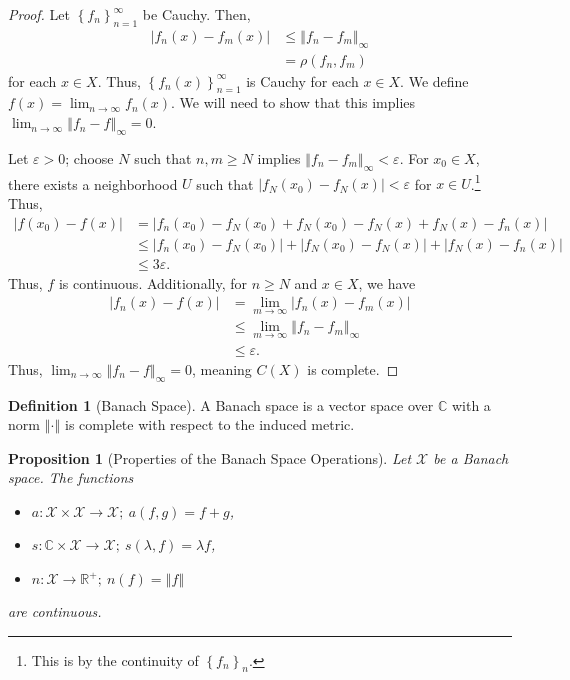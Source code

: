 \documentclass[12pt]{extarticle}
\newcommand{\R}{\mathbb{R}}
\newcommand{\C}{\mathbb{C}}
\newcommand{\norm}[1]{\left\Vert #1\right\Vert}
\newcommand{\set}[1]{\left\{#1\right\}}
\theoremstyle{plain}
\newtheorem*{proposition}{Proposition}
\theoremstyle{definition}
\newtheorem*{definition}{Definition}
\theoremstyle{note}
\renewcommand{\newline}{\hfill\break}
\begin{document}
\begin{proof}
  Let $\set{f_n}_{n=1}^{\infty}$ be Cauchy. Then,
  \begin{align*}
    \left\vert f_n(x) - f_m(x) \right\vert &\leq \norm{f_n - f_m}_{\infty}\\
    &= \rho(f_n,f_m)
  \end{align*}
  for each $x\in X$. Thus, $\set{f_n(x)}_{n=1}^{\infty}$ is Cauchy for each $x\in X$. We define $f(x) = \lim_{n\rightarrow \infty}f_n(x)$. We will need to show that this implies $\lim_{n\rightarrow\infty}\norm{f_n-f}_{\infty} = 0$.\newline

  Let $\varepsilon > 0$; choose $N$ such that $n,m \geq N$ implies $\norm{f_n - f_m}_{\infty} < \varepsilon$. For $x_0\in X$, there exists a neighborhood $U$ such that $\left\vert f_N(x_0) - f_N(x) \right\vert < \varepsilon$ for $x\in U$.\footnote{This is by the continuity of $\set{f_n}_n$.} Thus,
  \begin{align*}
    \left\vert f(x_0) - f(x) \right\vert &= \left\vert f_n(x_0) - f_N(x_0) + f_N(x_0) - f_N(x) + f_N(x) - f_n(x) \right\vert\\
                                         &\leq \left\vert f_n(x_0) - f_N(x_0) \right\vert + \left\vert f_N(x_0) - f_N(x) \right\vert + \left\vert f_N(x) - f_n(x) \right\vert\\
                                         &\leq 3\varepsilon.
  \end{align*}
  Thus, $f$ is continuous. Additionally, for $n\geq N$ and $x\in X$, we have
  \begin{align*}
    \left\vert f_n(x) - f(x) \right\vert &= \lim_{m\rightarrow\infty}\left\vert f_n(x) - f_m(x) \right\vert\\
                                         &\leq \lim_{m\rightarrow\infty}\norm{f_n-f_m}_{\infty}\\
                                         &\leq \varepsilon.
  \end{align*}
  Thus, $\lim_{n\rightarrow\infty}\norm{f_n - f}_{\infty} = 0$, meaning $C(X)$ is complete.
\end{proof}
\begin{definition}[Banach Space]
  A Banach space is a vector space over $\C$ with a norm $\norm{\cdot}$ is complete with respect to the induced metric.
\end{definition}
\begin{proposition}[Properties of the Banach Space Operations]
  Let $\mathcal{X}$ be a Banach space. The functions
  \begin{itemize}
    \item $a: \mathcal{X}\times \mathcal{X} \rightarrow \mathcal{X};\:a(f,g) = f+g$,
    \item $s: \C\times \mathcal{X}\rightarrow \mathcal{X};\:s(\lambda,f) = \lambda f$,
    \item $n: \mathcal{X}\rightarrow \R^{+};\:n(f) = \norm{f}$
  \end{itemize}
  are continuous.
\end{proposition}
\end{document}
